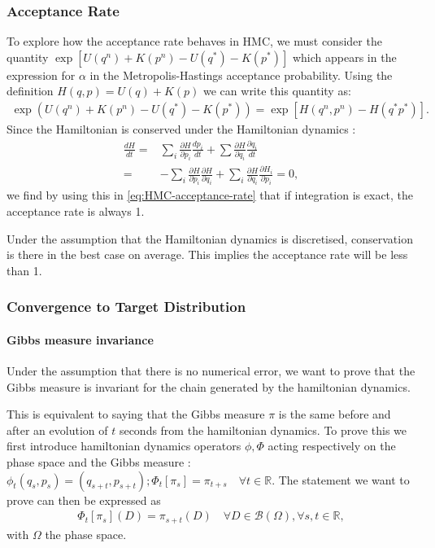 \documentclass[a4paper, 12pt,oneside]{article}
\begin{document}
			\subsubsection{Acceptance Rate}
			To explore how the acceptance rate behaves in HMC, we must consider the quantity \newline $\exp \left[U\left(q^n\right)+K\left(p^n\right)-U\left(q^*\right)-K\left(p^*\right)\right]$ which appears in the expression for $\alpha$ in the Metropolis-Hastings acceptance probability. Using the definition $H(q, p)=U(q)+K(p)$ we can write this quantity as:
			\begin{gather}
				\exp \left(U\left(q^n\right)+K\left(p^n\right)-U\left(q^*\right)-K\left(p^*\right)\right) = \exp \left[H\left(q^n, p^n\right)-H\left(q^* p^*\right)\right].
				\label{eq:HMC-acceptance-rate} 
			\end{gather}
			Since the Hamiltonian is conserved under the Hamiltonian dynamics :
			\begin{align}
			\frac{d H}{d t}=&\sum_i \frac{\partial H}{\partial p_i} \frac{d p_i}{d t}+\sum \frac{\partial H}{\partial q_i} \frac{\partial q_i}{d t} \\
			=&-\sum_i \frac{\partial H}{\partial p_i} \frac{\partial H}{\partial q_i}+\sum_i \frac{\partial H}{\partial q_i} \frac{\partial H_i}{\partial p_i} = 0,
			\end{align}
			we find by using this in \ref{eq:HMC-acceptance-rate} that if integration is exact, the acceptance rate is always 1.

			Under the assumption that the Hamiltonian dynamics is discretised, conservation is there in the best case on average. This implies the acceptance rate will be less than 1. 
			\subsubsection{Convergence to Target Distribution}
			\paragraph{Gibbs measure invariance}
			Under the assumption that there is no numerical error, we want to prove that the Gibbs measure is invariant for the chain generated by the hamiltonian dynamics.
	
			This is equivalent to saying that the Gibbs measure $\pi$ is the same before and after an evolution of $t$ seconds from the hamiltonian dynamics. 
			To prove this we first introduce hamiltonian dynamics operators $\phi,\Phi$ acting respectively on the phase space and the Gibbs measure : $\phi_t(q_s,p_s)=(q_{s+t},p_{s+t});\Phi_t[\pi_s]=\pi_{t+s}\quad \forall t\in\mathbb{R}$.
			The statement we want to prove can then be expressed as 
			\begin{gather}
				\Phi_t[\pi_s](D)=\pi_{s+t}(D)\quad \forall D\in\mathcal{B}(\Omega),\forall s,t\in\mathbb{R},
			\end{gather}
			with $\Omega$ the phase space.
	
\end{document}
